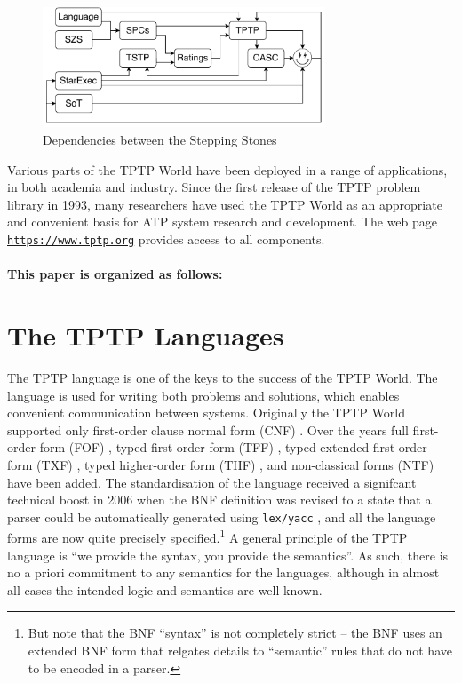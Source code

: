 \documentclass{easychair}
\newcommand{\smalltt}[1]{\small \texttt{#1}}
\begin{document}
\begin{figure}[htbp]
\centering
\includegraphics[width=0.75\textwidth]{Dependencies.pdf}
\caption{Dependencies between the Stepping Stones}
\label{Dependencies}
\end{figure}

Various parts of the TPTP World have been deployed in a range of applications, in both academia 
and industry.
Since the first release of the TPTP problem library in 1993, many researchers have used the 
TPTP World as an appropriate and convenient basis for ATP system research and development. 
The web page {\smalltt{\url{https://www.tptp.org}}} provides access to all components.

\paragraph{This paper is organized as follows:}

\section{The TPTP Languages}
\label{Languages}

The TPTP language \cite{Sut23-IGPL} is one of the keys to the success of the TPTP World.
The language is used for writing both problems and solutions,
which enables convenient communication between systems. 
Originally the TPTP World supported only first-order clause normal form (CNF)
\cite{SS98-JAR}.
Over the years full first-order form (FOF)
\cite{Sut09}, 
typed first-order form (TFF)
\cite{SS+12,BP13-TFF1}, 
typed extended first-order form (TXF)
\cite{SK18}, 
typed higher-order form (THF)
\cite{SB10,KSR16}, 
and non-classical forms (NTF) \cite{SF+22} have been added.
The standardisation of the language received a signifcant technical boost in 2006 when the BNF
definition was revised to a state that a parser could be automatically generated using
{\tt lex/yacc} \cite{VS06}, and all the language forms are now quite precisely 
specified.\footnote{%
But note that the BNF ``syntax'' is not completely strict -- the BNF uses an extended BNF form
that relgates details to ``semantic'' rules that do not have to be encoded in a parser.}
A general principle of the TPTP language is ``we provide the syntax, you provide the semantics''.
As such, there is no a priori commitment to any semantics for the languages, although in almost 
all cases the intended logic and semantics are well known.
\end{document}

